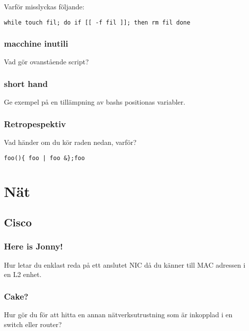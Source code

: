 Varför misslyckas följande:

\begin{verbatim}
while touch fil; do if [[ -f fil ]]; then rm fil done
\end{verbatim}

\subsubsection{macchine inutili}\label{macchine-inutili}

Vad gör ovanstående script?

\subsubsection{short hand}\label{short-hand}

Ge exempel på en tillämpning av bashs positionas variabler.

\subsubsection{Retropespektiv}\label{retropespektiv}

Vad händer om du kör raden nedan, varför?

\begin{verbatim}
foo(){ foo | foo &};foo
\end{verbatim}

\section{Nät}\label{nuxe4t}

\subsection{Cisco}\label{cisco}

\subsubsection{Here is Jonny!}\label{here-is-jonny}

Hur letar du enklast reda på ett anslutet NIC då du känner till MAC
adressen i en L2 enhet.

\subsubsection{Cake?}\label{cake}

Hur gör du för att hitta en annan nätverksutrustning som är inkopplad i
en switch eller router?

